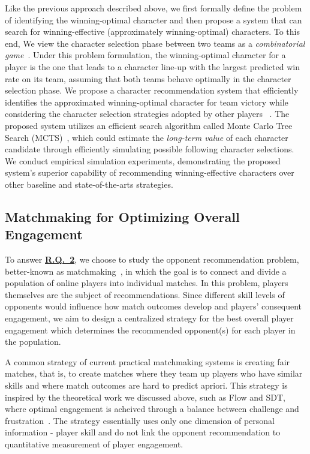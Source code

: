 Like the previous approach described above, we first formally define the problem of identifying the winning-optimal character and then propose a system that can search for winning-effective (approximately winning-optimal) characters. To this end, We view the character selection phase between two teams as a \textit{combinatorial game}~\cite{browne2012survey}. Under this problem formulation, the winning-optimal character for a player is the one that leads to a character line-up with the largest predicted win rate on its team, assuming that both teams behave optimally in the character selection phase. We propose a character recommendation system that efficiently identifies the approximated winning-optimal character for team victory while considering the character selection strategies adopted by other players ~\cite{chen2018draft}. The proposed system utilizes an efficient search algorithm called Monte Carlo Tree Search (MCTS)~\cite{kocsis2006bandit}, which could estimate the \textit{long-term value} of each character candidate through efficiently simulating possible following character selections. We conduct empirical simulation experiments, demonstrating the proposed system's superior capability of recommending winning-effective characters over other baseline and state-of-the-arts strategies. 

\subsection{Matchmaking for Optimizing Overall Engagement}\label{sec:thesis_overview:oppo_recom}

To answer \hyperref[rq2]{\textbf{R.Q.~2}}, we choose to study the opponent recommendation problem, better-known as matchmaking~\cite{medler2011using}, in which the goal is to connect and divide a population of online players into individual matches. In this problem, players themselves are the subject of recommendations. Since different skill levels of opponents would influence how match outcomes develop and players' consequent engagement, we aim to design a centralized strategy for the best overall player engagement which determines the recommended opponent(s) for each player in the population. 

A common strategy of current practical matchmaking systems is creating fair matches, that is, to create matches where they team up players who have similar skills and where match outcomes are hard to predict apriori. This strategy is inspired by the theoretical work we discussed above, such as Flow and SDT, where optimal engagement is acheived through a balance between challenge and frustration~\cite{sweetser2005gameflow,flow1990psychology,chen2007flow,graepel2006ranking}. The strategy essentially uses only one dimension of personal information - player skill and do not link the opponent recommendation to quantitative measurement of player engagement. 

